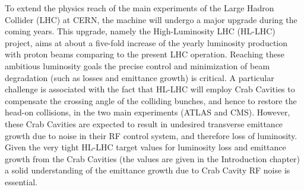 To extend the physics reach of the main experiments of the Large Hadron Collider (LHC) at CERN, the machine will undergo a major upgrade during the coming years. This upgrade, namely the High-Luminosity LHC (HL-LHC) project, aims at about a five-fold increase of the yearly luminosity production with proton beams comparing to the present LHC operation. Reaching these ambitious luminosity goals the precise control and minimization of beam degradation (such as losses and emittance growth) is critical. A particular challenge is associated with the fact that HL-LHC will employ Crab Cavities to compensate the crossing angle of the colliding bunches, and hence to restore the head-on collisions, in the two main experiments (ATLAS and CMS). However, these Crab Cavities are expected to result in undesired transverse emittance growth due to noise in their RF control system, and therefore loss of luminosity. %
Given the very tight HL-LHC target values for luminosity loss and emittance growth from the Crab Cavities (the values are given in the Introduction chapter)
a solid understanding of the emittance growth due to Crab Cavity RF noise is essential. 


